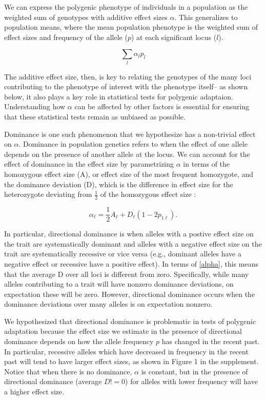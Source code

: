 \documentclass[a4paper,12pt]{article}
\begin{document}
We can express the polygenic phenotype of individuals in a population
as the weighted sum of genotypes with additive effect sizes
$\alpha$. This generalizes to population means, where the mean
population phenotype is the weighted sum of effect sizes and frequency
of the allele ($p$) at each significant locus ($l$). \cite{gillespie}

\begin{equation}
  \sum_l{\alpha_lp_l}
\end{equation}

The additive effect size, then, is key to relating the genotypes of
the many loci contributing to the phenotype of interest with the
phenotype itself-- as shown below, it also plays a key role in statistical tests for
polygenic adaptaion. Understanding how $\alpha$ can be
affected by other factors is essential for ensuring that these
statistical tests remain as unbiased as possible. 

Dominance is one such phenomenon that we hypothesize has a non-trivial
effect on $\alpha$. Dominance in population genetics refers to when the effect of one
allele depends on the presence of another allele at the locus. We can account for
the effect of dominance in the effect size by parametrizing $\alpha$
in terms of the homozygous effect size (A), or effect size of the most frequent homozygote, and the
dominance deviation (D), which is the difference in effect size for the heterozygote
deviating from $\frac{1}{2}$ of the homozygous effect size \cite{gillespie}:

\begin{equation}  
  \alpha_\ell = \frac{1}{2} A_\ell + D_\ell\left(1-2p_{1\ell}\right).
  \label{alpha}
\end{equation}

In particular, directional dominance is when alleles with a postive effect
size on the trait are systematically dominant and alleles with a
negative effect size on the trait are systematically recessive or vice
versa (e.g., dominant alleles have a negative effect or recessive have
a positive effect). In terms of \eqref{alpha}, this means that the
average D over all loci is different from zero. Specifically, while
many alleles contributing to a trait will have nonzero dominance
deviations, on expectation these will be zero. However, directional
dominance occurs when the dominance deviations over many alleles is on
expectation nonzero.

We hypothesized that directional dominance is problematic in tests of polygenic adaptation
because the effect size we estimate in the presence of directional
dominance depends on how the allele frequency $p$ has changed in the
recent past. In particular, recessive alleles which have decreased in frequency
in the recent past will tend to have larger effect sizes, as shown in
Figure 1 in the supplement. Notice that when there is no dominance,
$\alpha$ is constant, but in the presence of directional dominance
(average $D!=0$) for alleles with lower frequency will have a higher
effect size. 
\end{document}
